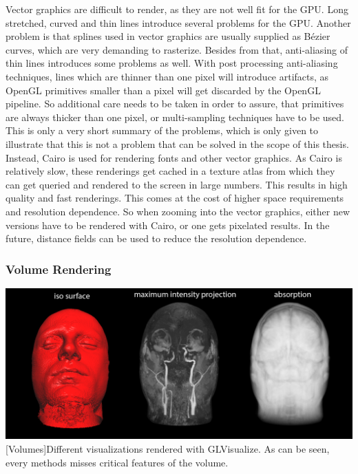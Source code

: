 Vector graphics are difficult to render, as they are not well fit for the \ac{GPU}.
Long stretched, curved and thin lines introduce several problems for the GPU\cite{Liland565821}.
Another problem is that splines used in vector graphics are usually supplied as Bézier curves, which are very demanding to rasterize.
Besides from that, anti-aliasing of thin lines introduces some problems as well. With post processing anti-aliasing techniques, lines which are thinner than one pixel will introduce artifacts, as OpenGL primitives smaller than a pixel will get discarded by the OpenGL pipeline. So additional care needs to be taken in order to assure, that primitives are always thicker than one pixel, or multi-sampling techniques have to be used.
This is only a very short summary of the problems, which is only given to illustrate that this is not a problem that can be solved in the scope of this thesis. 
Instead, Cairo is used for rendering fonts and other vector graphics. As Cairo is relatively slow, these renderings get cached in a texture atlas from which they can get queried and rendered to the screen in large numbers.
This results in high quality and fast renderings. This comes at the cost of higher space requirements and resolution dependence.
So when zooming into the vector graphics, either new versions have to be rendered with Cairo, or one gets pixelated results.
In the future, distance fields can be used to reduce the resolution dependence\cite{Green:2007:IAM:1281500.1281665}.

\subsubsection{Volume Rendering}
\vspace{1em}
\begin{minipage}{\linewidth}
    \centering
    \includegraphics[width=0.9\linewidth]{graphics/volumes.png}
    [Volumes]{Different visualizations rendered with GLVisualize. As can be seen, every methods misses critical features of the volume.}
    \label{fig:volumes}
\end{minipage}

